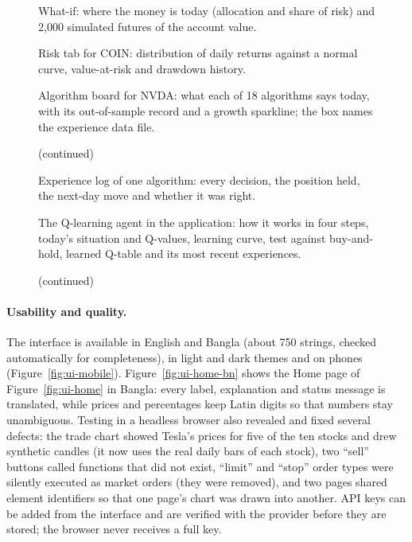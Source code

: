 \begin{figure}[!htbp]
\centering
{}
\caption{What-if: where the money is today (allocation and share of risk) and 2{,}000 simulated futures of the account value.}
\label{fig:ui-whatif}
\end{figure}
\begin{figure}[!htbp]
\centering
{}
\caption{Risk tab for COIN: distribution of daily returns against a normal curve, value-at-risk and drawdown history.}
\label{fig:ui-risk}
\end{figure}
\begin{figure}[!htbp]
\centering
{}
\caption{Algorithm board for NVDA: what each of 18 algorithms says today, with its out-of-sample record and a growth sparkline; the box names the experience data file.}
\label{fig:ui-algo}
\end{figure}
\begin{figure}[!htbp]
\ContinuedFloat
\centering
{}
\caption[]{(continued)}
\end{figure}
\begin{figure}[!htbp]
\centering
{}
\caption{Experience log of one algorithm: every decision, the position held, the next-day move and whether it was right.}
\label{fig:ui-experience}
\end{figure}
\begin{figure}[!htbp]
\centering
{}
\caption{The Q-learning agent in the application: how it works in four steps, today's situation and Q-values, learning curve, test against buy-and-hold, learned Q-table and its most recent experiences.}
\label{fig:ui-rl}
\end{figure}
\begin{figure}[!htbp]
\ContinuedFloat
\centering
{}
\caption[]{(continued)}
\end{figure}

\paragraph{Usability and quality.} The interface is available in English and Bangla (about 750 strings, checked automatically for completeness), in light and dark themes and on phones (Figure~\ref{fig:ui-mobile}). Figure~\ref{fig:ui-home-bn} shows the Home page of Figure~\ref{fig:ui-home} in Bangla: every label, explanation and status message is translated, while prices and percentages keep Latin digits so that numbers stay unambiguous. Testing in a headless browser also revealed and fixed several defects: the trade chart showed Tesla's prices for five of the ten stocks and drew synthetic candles (it now uses the real daily bars of each stock), two ``sell'' buttons called functions that did not exist, ``limit'' and ``stop'' order types were silently executed as market orders (they were removed), and two pages shared element identifiers so that one page's chart was drawn into another. API keys can be added from the interface and are verified with the provider before they are stored; the browser never receives a full key.

